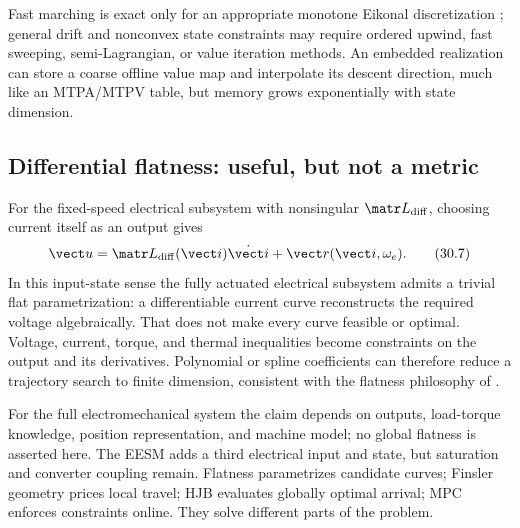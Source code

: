 Fast marching is exact only for an appropriate monotone Eikonal discretization
\parencite{sethian1996}; general drift and nonconvex state constraints may
require ordered upwind, fast sweeping, semi-Lagrangian, or value iteration
methods.  An embedded realization can store a coarse offline value map and
interpolate its descent direction, much like an MTPA/MTPV table, but memory
grows exponentially with state dimension.

\subsection{Differential flatness: useful, but not a metric}

For the fixed-speed electrical subsystem with nonsingular
\(\matr L_{\mathrm{diff}}\), choosing current itself as an output gives
\[
 \vect u=\matr L_{\mathrm{diff}}(\vect i)\dot{\vect i}
 +\vect r(\vect i,\omega_e).
 \tag{30.7}
\]
In this input-state sense the fully actuated electrical subsystem admits a
trivial flat parametrization: a differentiable current curve reconstructs the
required voltage algebraically.  That does not make every curve feasible or
optimal.  Voltage, current, torque, and thermal inequalities become constraints
on the output and its derivatives.  Polynomial or spline coefficients can
therefore reduce a trajectory search to finite dimension, consistent with the
flatness philosophy of \textcite{fliess1995}.

For the full electromechanical system the claim depends on outputs, load-torque
knowledge, position representation, and machine model; no global flatness is
asserted here.  The EESM adds a third electrical input and state, but saturation
and converter coupling remain.  Flatness parametrizes candidate curves;
Finsler geometry prices local travel; HJB evaluates globally optimal arrival;
MPC enforces constraints online.  They solve different parts of the problem.

